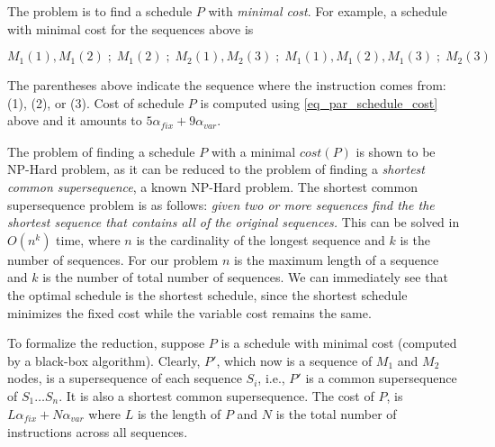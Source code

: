 



The problem is to find a schedule $P$ with \emph{minimal cost}. For example, a schedule with minimal cost for the sequences above is 

$$ 
M_1(1), M_1(2) \; ;\; M_1(2) \; ; \; M_2(1), M_2(3) \; ; \; M_1(1), M_1(2), M_1(3) \; ; \;  M_2(3)
$$

The parentheses above indicate the sequence where the instruction comes from: (1), (2), or (3). 
Cost of schedule $P$ is computed using \cref{eq_par_schedule_cost} above and it amounts to $5\alpha_\mathit{fix} + 9\alpha_\mathit{var}$.

The problem of finding a schedule $P$ with a minimal $cost(P)$ is shown to be NP-Hard problem, as it can be reduced to the problem of finding a \emph{shortest common supersequence}, a known NP-Hard problem\cite{Maier1978, Vazirani2010}. The shortest common supersequence problem is as follows: {\it given two or more sequences find the the shortest sequence that contains all of the original sequences.} This can be solved in $O(n^k)$ time, where $n$ is the cardinality of the longest sequence and $k$ is the number of sequences. For our problem $n$ is the maximum length of a sequence and $k$ is the number of total number of sequences. We can immediately see that the optimal schedule is the shortest schedule, since the shortest schedule minimizes the fixed cost while the variable cost remains the same.

 To formalize the reduction, suppose $P$ is a schedule with minimal cost (computed by a black-box algorithm). 
Clearly, $P'$, which now is a sequence of $M_1$ and $M_2$ nodes, is a supersequence of each sequence $S_i$, i.e., $P'$ is a common supersequence of $S_1 \dots S_n$. It is also a shortest common supersequence. 
The cost of $P$, is $L\alpha_\mathit{fix}+N\alpha_\mathit{var}$ where $L$ is the length of $P$ and $N$ is the total number of instructions across all sequences. %

